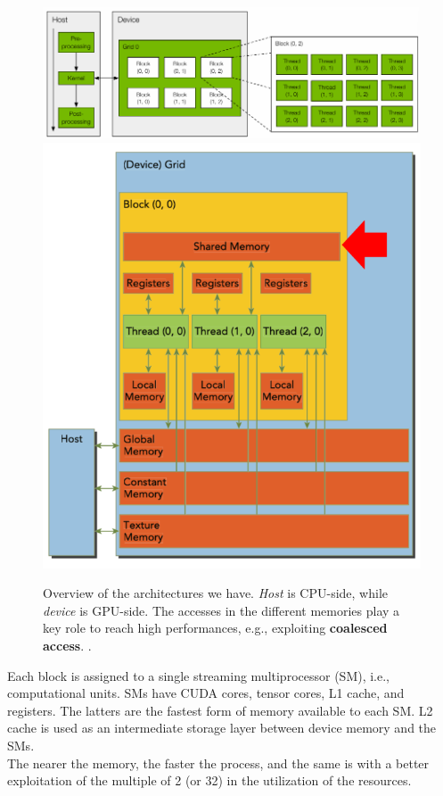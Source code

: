 \documentclass[conference]{IEEEtran}
\begin{document}
	\begin{figure}[htbp]
		\centering
		\includegraphics[width=\linewidth]{Immagine 2025-01-27 220907.png}
		\includegraphics[width=0.7\linewidth]{Immagine 2025-01-28 093207.png}
		\caption{Overview of the architectures we have. \textit{Host} is CPU-side, while \textit{device} is GPU-side. The accesses in the different memories play a key role to reach high performances, e.g., exploiting \textbf{coalesced access}. \cite{gpu101_lecture1}.}
	\end{figure}
	Each block is assigned to a single streaming multiprocessor (SM), i.e., computational units. SMs have CUDA cores, tensor cores, L1 cache, and registers. The latters are the fastest form of memory available to each SM. L2 cache is used as an intermediate storage layer between device memory and the SMs\cite{gpu101_lecture1}.\\
	The nearer the memory, the faster the process, and the same is with a better exploitation of the multiple of 2 (or 32) in the utilization of the resources.
	
\end{document}

